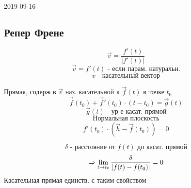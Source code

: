 \documentclass[main]{subfiles}
\begin{document}
\begin{lect} {2019-09-16}
	\subsection{Репер Френе}
		\begin{Definition}
			\[\vec{v} = \frac{f'(t)}{|f'(t)|}\]
			\[\vec{v} = f'(t) \text{ - если парам. натуральн.}\]
			\[v \text{ - касательный вектор}\]
		\end{Definition}

		\begin{definition}
			Прямая, содерж в $\vec{v}$ наз. касательной к $\vec{f}(t)$ в точке $t_0$
            \[\vec{f}(t_0) + \vec{f}'(t_0) \cdot (t - t_0) = \vec{g}(t)\]
			\[\vec{g}(t) \text{ - ур-е касат. прямой}\]
			\[\text{Нормальная плоскость}\]
			\[f'(t_0) \cdot (\vec{h} - \vec{f}(t_0)) = 0\]
		\end{definition}

		\begin{Theorem}
			\[\delta \text{ - расстояние от }f(t) \text{ до касат. прямой}\]
			\[\Rightarrow \lim_{t \to t_0} \frac{\delta}{|f(t) - f(t_0)|} = 0 \]
			Касательная прямая единств. с таким свойством
		\end{Theorem}
	\end{lect}
\end{document}
